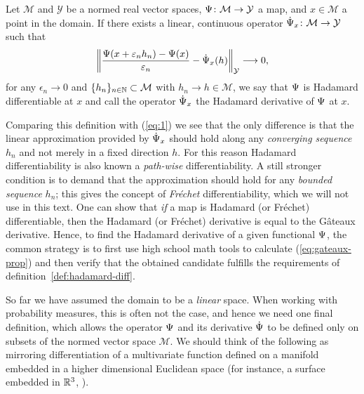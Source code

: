 \documentclass[a4,danish]{article}
\begin{document}
\begin{definition}
  \label{def:hadamard-diff}
  Let $\mathcal{M}$ and $\mathcal{Y}$ be a normed real vector spaces,
  $\operatorname{\Psi} \colon \mathcal{M} \rightarrow \mathcal{Y}$ a map, and $x \in \mathcal{M}$ a point in the
  domain. If there exists a linear, continuous operator
  $\dot{\operatorname{\Psi}}_x \colon \mathcal{M} \rightarrow \mathcal{Y} $ such that
  \begin{equation*}
    \left\Vert
      \frac{\operatorname{\Psi}(x + \varepsilon_n h_n) - \operatorname{\Psi}(x)}{\varepsilon_n} - \dot{\operatorname{\Psi}}_x(h)
    \right\Vert_{\mathcal{Y}} \longrightarrow 0,
  \end{equation*}
  for any $\epsilon_n \rightarrow 0$ and $\{h_n\}_{n \in \mathbb{N}} \subset \mathcal{M}$ with
  $h_n \rightarrow h \in \mathcal{M}$, we say that $\operatorname{\Psi}$ is Hadamard differentiable at $x$ and call
  the operator $\dot{\operatorname{\Psi}}_x$ the Hadamard derivative of $\operatorname{\Psi}$ at $x$.
\end{definition}

Comparing this definition with (\ref{eq:1}) we see that the only
difference is that the linear approximation provided by $\dot{\operatorname{\Psi}}_x$
should hold along any \textit{converging sequence} $h_n$ and not
merely in a fixed direction $h$. For this reason Hadamard
differentiability is also known a \textit{path-wise}
differentiability. A still stronger condition is to demand that the
approximation should hold for any \textit{bounded sequence} $h_n$;
this gives the concept of \textit{Fréchet} differentiability, which we 
will not use in this text. One can show that \textit{if} a map is
Hadamard (or Fréchet) differentiable, then the Hadamard (or Fréchet)
derivative is equal to the Gâteaux derivative. Hence, to find the
Hadamard derivative of a given functional $\operatorname{\Psi}$, the common strategy
is to first use high school math tools to calculate
(\ref{eq:gateaux-prop}) and then verify that the obtained candidate
fulfills the requirements of definition~\ref{def:hadamard-diff}.

So far we have assumed the domain to be a \textit{linear} space. When
working with probability measures, this is often not the case, and
hence we need one final definition, which allows the operator $\operatorname{\Psi}$
and its derivative $\dot{\operatorname{\Psi}}$ to be defined only on subsets of the
normed vector space $\mathcal{M}$. We should think of the following as
mirroring differentiation of a multivariate function defined on a
manifold embedded in a higher dimensional Euclidean space (for
instance, a surface embedded in $\mathbb{R}^3$, ).
\end{document}
